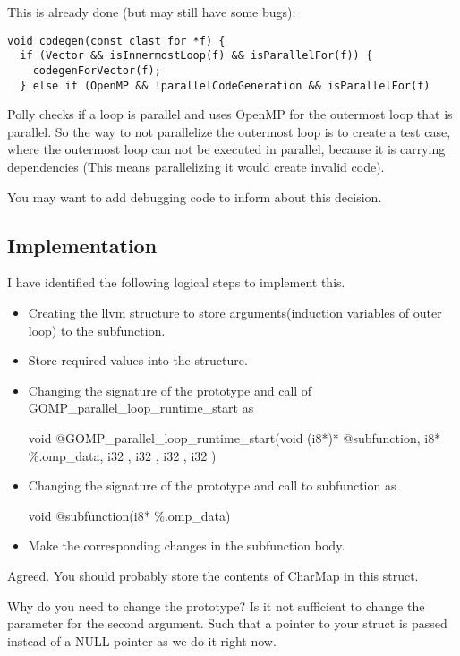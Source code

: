 \documentclass[a4paper,10pt]{article}
\begin{document}
This is already done (but may still have some bugs):

\begin{verbatim}
void codegen(const clast_for *f) {
  if (Vector && isInnermostLoop(f) && isParallelFor(f)) {
    codegenForVector(f);
  } else if (OpenMP && !parallelCodeGeneration && isParallelFor(f)

\end{verbatim}

Polly checks if a loop is parallel and uses OpenMP for the outermost loop that is parallel. So the way to not parallelize the outermost loop is to create a test case, where the outermost loop can not be executed in parallel, because it is carrying dependencies (This means parallelizing it would create invalid code).

You may want to add debugging code to inform about this decision.

\subsection{Implementation}

I have identified the following logical steps to implement this.
\begin{itemize}
\item Creating the llvm structure to store arguments(induction variables
  of outer loop) to the subfunction.
\item Store required values into the structure.
\item Changing the signature of the prototype and call of
GOMP\_parallel\_loop\_runtime\_start as

void @GOMP\_parallel\_loop\_runtime\_start(void (i8*)* @subfunction, i8*
  \%.omp\_data, i32 , i32 , i32 , i32 )

\item Changing the signature of the prototype and call to subfunction  as

void @subfunction(i8* \%.omp\_data)

\item Make the corresponding changes in the subfunction body.
\end{itemize}

Agreed. You should probably store the contents of CharMap in this struct.

Why do you need to change the prototype? Is it not sufficient to change
the parameter for the second argument. Such that a pointer to your struct is passed instead of a NULL pointer as we do it right now.
\end{document}
